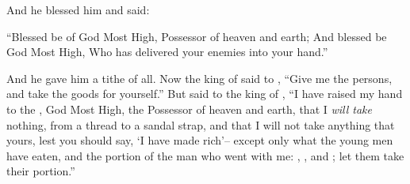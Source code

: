 \bverse And he blessed him and said:
\begin{bquotation}
``Blessed be  of God Most High, Possessor of heaven and earth; \bverse And blessed be God Most High, Who has delivered your enemies into your hand.''
\end{bquotation}
And he gave him a tithe of all.
\bverse Now the king of  said to , ``Give me the persons, and take the goods for yourself.''
\bverse But  said to the king of , ``I have raised my hand to the \lord, God Most High, the Possessor of heaven and earth,
\bverse that I \textit{will take} nothing, from a thread to a sandal strap, and that I will not take anything that \is yours, lest you should say, `I have made  rich'--
\bverse except only what the young men have eaten, and the portion of the man who went with me: , , and ; let them take their portion.''
